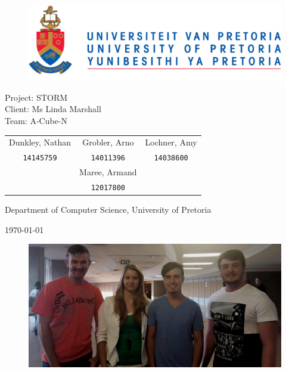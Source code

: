 \documentclass[english]{article}
\date{\today}
\begin{document}
	
	\begin{titlepage}
		\begin{figure}[!t]
			\includegraphics[width=\linewidth]{up_logo.png}
		\end{figure}
		\begin{center}
			\huge{Project: STORM}\\
			\large{Client: Ms Linda Marshall}\\
			\vspace{10mm}
			\huge{Team: A-Cube-N}\\
		\end{center}
		\begin{center}
			\begin{tabular}{ c c c }
				Dunkley, Nathan & Grobler, Arno & Lochner, Amy \\
				\texttt{14145759} & \texttt{14011396} & \texttt{14038600}\\
				& Maree, Armand &\\
				& \texttt{12017800} &
			\end{tabular}
		\end{center}
		\begin{center}
			Department of Computer Science, University of Pretoria
		\end{center}
		\begin{center}
			\today
			\begin{figure}[!h]
				\includegraphics[width=\linewidth]{team.jpg}
			\end{figure}
		\end{center}
	\end{titlepage}
	\newpage
	\tableofcontents
	\newpage
\end{document}

